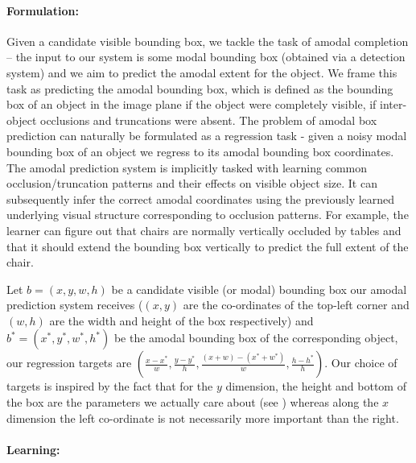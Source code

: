 
\paragraph{Formulation:} Given a candidate visible bounding box, we tackle the task of amodal completion -- the input to our system is some modal bounding box (\eg obtained via a detection system) and we aim to predict the amodal extent for the object. We frame this task as predicting the amodal bounding box, which is defined as  the bounding box of an object in the image plane if the object were completely visible, \ie if inter-object occlusions and truncations were absent. The problem of amodal box prediction can naturally be formulated as a regression task - given a noisy modal bounding box of an object we regress to its amodal bounding box coordinates. The amodal prediction system is implicitly tasked with learning common occlusion/truncation patterns and their effects on visible object size. It can subsequently infer the correct amodal coordinates using the previously learned underlying visual structure corresponding to occlusion patterns. For example, the learner can figure out that chairs are normally vertically occluded by tables and that it should extend the bounding box vertically to predict the full extent of the chair.

Let $b = (x,y,w,h)$ be a candidate visible (or modal) bounding box our amodal prediction system receives ($(x,y)$ are the co-ordinates of the top-left corner and $(w,h)$ are the width and height of the box respectively) and $b^* = (x^*,y^*,w^*,h^*)$ be the amodal bounding box of the corresponding object, our regression targets are $(\frac{x-x^*}{w},\frac{y-y^*}{h},\frac{(x+w)-(x^*+w^*)}{w},\frac{h-h^*}{h})$. Our choice of targets is inspired by the fact that for the $y$ dimension, the height and bottom of the box are the parameters we actually care about (see ) whereas along the $x$ dimension the left co-ordinate is not necessarily more important than the right.

\paragraph{Learning:}

